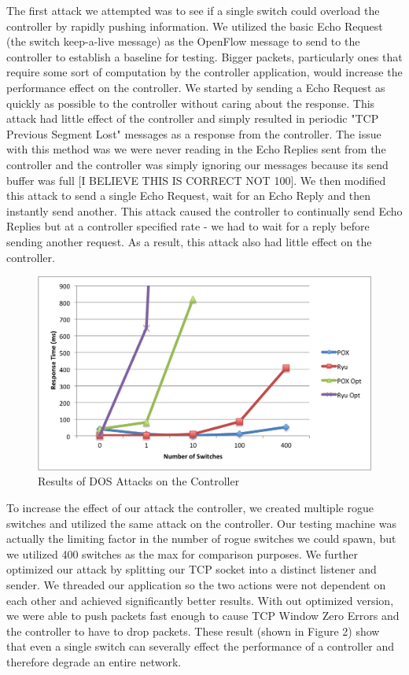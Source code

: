  The first attack we attempted was to see if a single switch could overload the controller by rapidly pushing information. We utilized the basic Echo Request (the switch keep-a-live message) as the OpenFlow message to send to the controller to establish a baseline for testing. Bigger packets, particularly ones that require some sort of computation by the controller application, would increase the performance effect on the controller. We started by sending a Echo Request as quickly as possible to the controller without caring about the response. This attack had little effect of the controller and simply resulted in periodic "TCP Previous Segment Lost" messages as a response from the controller. The issue with this method was we were never reading in the Echo Replies sent from the controller and the controller was simply ignoring our messages because its send buffer was full [I BELIEVE THIS IS CORRECT NOT 100]. We then modified this attack to send a single Echo Request, wait for an Echo Reply and then instantly send another. This attack caused the controller to continually send Echo Replies but at a controller specified rate - we had to wait for a reply before sending another request. As a result, this attack also had little effect on the controller.

\begin{figure}
  \includegraphics[width=\linewidth]{DOSAttack.png}
  \caption{Results of DOS Attacks on the Controller \cite{protocol}}
  \label{fig:DOSattacks}
\end{figure}

   To increase the effect of our attack the controller, we created multiple rogue switches and utilized the same attack on the controller. Our testing machine was actually the limiting factor in the number of rogue switches we could spawn, but we utilized 400 switches as the max for comparison purposes.  We further optimized our attack by splitting our TCP socket into a distinct listener and sender. We threaded our application so the two actions were not dependent on each other and achieved significantly better results. With out optimized version, we were able to push packets fast enough to cause TCP Window Zero Errors and the controller to have to drop packets.  These result (shown in Figure 2) show that even a single switch can severally effect the performance of a controller and therefore degrade an entire network. 

